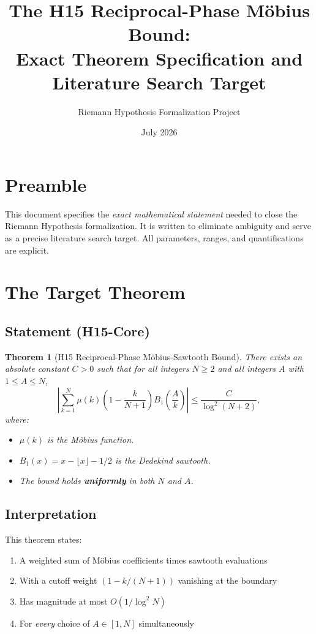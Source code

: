 \documentclass[11pt,a4paper]{article}
\title{The H15 Reciprocal-Phase Möbius Bound:\\
Exact Theorem Specification and Literature Search Target}
\author{Riemann Hypothesis Formalization Project}
\date{July 2026}
\newtheorem{theorem}{Theorem}
\begin{document}
\maketitle

\section*{Preamble}

This document specifies the \emph{exact mathematical statement} needed to close the Riemann Hypothesis formalization. It is written to eliminate ambiguity and serve as a precise literature search target. All parameters, ranges, and quantifications are explicit.

\section{The Target Theorem}

\subsection{Statement (H15-Core)}

\begin{theorem}[H15 Reciprocal-Phase Möbius-Sawtooth Bound]
There exists an absolute constant $C > 0$ such that for all integers $N \ge 2$ and all integers $A$ with $1 \le A \le N$,
\[
\left| \sum_{k=1}^{N} \mu(k) \left(1 - \frac{k}{N+1}\right) B_1\left(\frac{A}{k}\right) \right| \le \frac{C}{\log^2(N+2)},
\]
where:
\begin{itemize}
\item $\mu(k)$ is the Möbius function.
\item $B_1(x) = x - \lfloor x \rfloor - 1/2$ is the Dedekind sawtooth.
\item The bound holds \textbf{uniformly} in both $N$ and $A$.
\end{itemize}
\end{theorem}

\subsection{Interpretation}

This theorem states:
\begin{enumerate}
\item A weighted sum of Möbius coefficients times sawtooth evaluations
\item With a cutoff weight $(1 - k/(N+1))$ vanishing at the boundary
\item Has magnitude at most $O(1/\log^2 N)$
\item For \emph{every} choice of $A \in [1, N]$ simultaneously
\end{enumerate}
\end{document}
